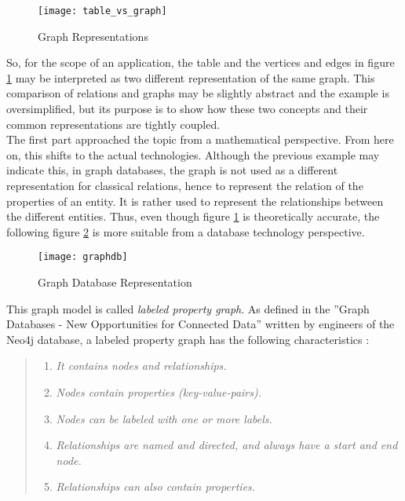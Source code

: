 \begin{figure}[H]
	\centering
	\texttt{[image: table\_vs\_graph]}
	\caption[Graph Representations]{Graph Representations }
	\label{fig:GraphTheoryExample}
\end{figure}

So, for the scope of an application, the table and the vertices and edges in figure \ref{fig:GraphTheoryExample} may be interpreted as two different representation of the same graph. This comparison of relations and graphs may be slightly abstract and the example is oversimplified, but its purpose is to show how these two concepts and their common representations are tightly coupled.\\

The first part approached the topic from a mathematical perspective. From here on, this shifts to the actual technologies. Although the previous example may indicate this, in graph databases, the graph is not used as a different representation for classical relations, hence to represent the relation of the properties of an entity. It is rather used to represent the relationships between the different entities. Thus, even though figure \ref{fig:GraphTheoryExample} is theoretically accurate, the following figure \ref{fig:GraphDBExample} is more suitable from a database technology perspective.

\begin{figure}[H]
	\centering
	\texttt{[image: graphdb]}
	\caption[Graph Database Representation]{Graph Database Representation }
	\label{fig:GraphDBExample}
\end{figure}

This graph model is called \emph{labeled property graph}. As defined in the ''Graph Databases - New Opportunities for Connected Data'' written by engineers of the Neo4j database, a labeled property graph has the following characteristics \cite{neo4j}:

\begin{quote}
	\begin{enumerate}
		\item\textit{It contains nodes and relationships. }
		\item\textit{Nodes contain properties (key-value-pairs). }
		\item\textit{Nodes can be labeled with one or more labels. }
		\item\textit{Relationships are named and directed, and always have a start and end node. }
		\item\textit{Relationships can also contain properties. }
	\end{enumerate}
\end{quote}

